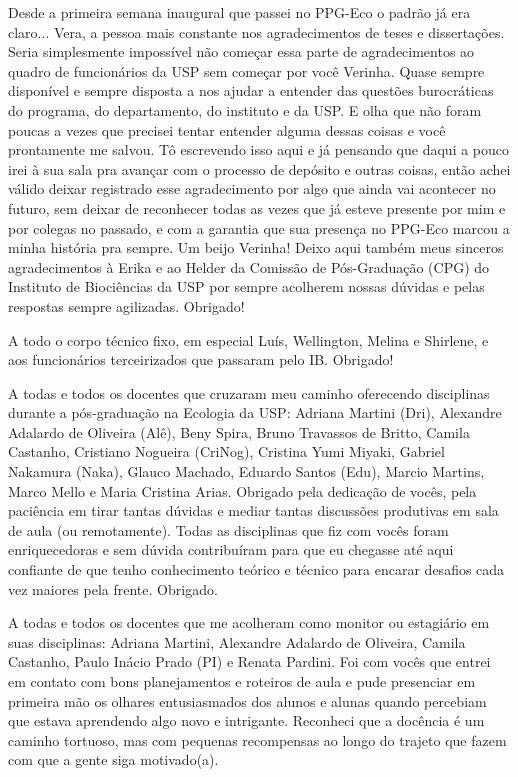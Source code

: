 \documentclass[12pt,openright,oneside,a4paper,english]{abntex2}
\begin{document}
\begin{agradecimentos}[Agradecimentos]
Desde a primeira semana inaugural que passei no PPG-Eco o padrão já era claro... Vera, a pessoa mais constante nos agradecimentos de teses e dissertações. Seria simplesmente impossível não começar essa parte de agradecimentos ao quadro de funcionários da USP sem começar por você Verinha. Quase sempre disponível e sempre disposta a nos ajudar a entender das questões burocráticas do programa, do departamento, do instituto e da USP. E olha que não foram poucas a vezes que precisei tentar entender alguma dessas coisas e você prontamente me salvou. Tô escrevendo isso aqui e já pensando que daqui a pouco irei à sua sala pra avançar com o processo de depósito e outras coisas, então achei válido deixar registrado esse agradecimento por algo que ainda vai acontecer no futuro, sem deixar de reconhecer todas as vezes que já esteve presente por mim e por colegas no passado, e com a garantia que sua presença no PPG-Eco marcou a minha história pra sempre. Um beijo Verinha! Deixo aqui também meus sinceros agradecimentos à Erika e ao Helder da Comissão de Pós-Graduação (CPG) do Instituto de Biociências da USP por sempre acolherem nossas dúvidas e pelas respostas sempre agilizadas. Obrigado!

A todo o corpo técnico fixo, em especial Luís, Wellington, Melina e Shirlene, e aos funcionários terceirizados que passaram pelo IB. Obrigado!

A todas e todos os docentes que cruzaram meu caminho oferecendo disciplinas durante a pós-graduação na Ecologia da USP: Adriana Martini (Dri), Alexandre Adalardo de Oliveira (Alê), Beny Spira, Bruno Travassos de Britto, Camila Castanho, Cristiano Nogueira (CriNog), Cristina Yumi Miyaki, Gabriel Nakamura (Naka), Glauco Machado, Eduardo Santos (Edu), Marcio Martins, Marco Mello e Maria Cristina Arias. Obrigado pela dedicação de vocês, pela paciência em tirar tantas dúvidas e mediar tantas discussões produtivas em sala de aula (ou remotamente). Todas as disciplinas que fiz com vocês foram enriquecedoras e sem dúvida contribuíram para que eu chegasse até aqui confiante de que tenho conhecimento teórico e técnico para encarar desafios cada vez maiores pela frente. Obrigado.

A todas e todos os docentes que me acolheram como monitor ou estagiário em suas disciplinas: Adriana Martini, Alexandre Adalardo de Oliveira, Camila Castanho, Paulo Inácio Prado (PI) e Renata Pardini. Foi com vocês que entrei em contato com bons planejamentos e roteiros de aula e pude presenciar em primeira mão os olhares entusiasmados dos alunos e alunas quando percebiam que estava aprendendo algo novo e intrigante. Reconheci que a docência é um caminho tortuoso, mas com pequenas recompensas ao longo do trajeto que fazem com que a gente siga motivado(a).


\end{agradecimentos}
\end{document}
